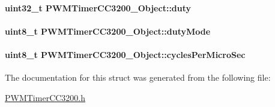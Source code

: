 \paragraph[{duty}]{\setlength{\rightskip}{0pt plus 5cm}uint32\-\_\-t P\-W\-M\-Timer\-C\-C3200\-\_\-\-Object\-::duty}\label{struct_p_w_m_timer_c_c3200___object_abcda935ccb7d1926e3044fe22c742ed7}
\paragraph[{duty\-Mode}]{\setlength{\rightskip}{0pt plus 5cm}uint8\-\_\-t P\-W\-M\-Timer\-C\-C3200\-\_\-\-Object\-::duty\-Mode}\label{struct_p_w_m_timer_c_c3200___object_af1f6cc3a1691db65a6dae41451f77789}
\paragraph[{cycles\-Per\-Micro\-Sec}]{\setlength{\rightskip}{0pt plus 5cm}uint8\-\_\-t P\-W\-M\-Timer\-C\-C3200\-\_\-\-Object\-::cycles\-Per\-Micro\-Sec}\label{struct_p_w_m_timer_c_c3200___object_adf7dc7746a99106f353aeb980b401a7d}


The documentation for this struct was generated from the following file\-:\begin{DoxyCompactItemize}
\item 
\hyperlink{_p_w_m_timer_c_c3200_8h}{P\-W\-M\-Timer\-C\-C3200.\-h}\end{DoxyCompactItemize}
